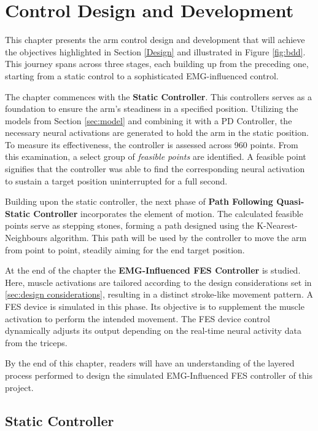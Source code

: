 \chapter{Control Design and Development}

This chapter presents the arm control design and development that will achieve the objectives highlighted in Section \ref{Design} and illustrated in Figure \ref{fig:bdd}. This journey spans across three stages, each building up from the preceding one, starting from a static control to a sophisticated EMG-influenced control.  

The chapter commences with the \textbf{Static Controller}. This controllers serves as a foundation to ensure the arm's steadiness in a specified position. Utilizing the models from Section \ref{sec:model} and combining it with a PD Controller, the necessary neural activations are generated to hold the arm in the static position. To measure its effectiveness, the controller is assessed across 960 points. From this examination, a select group of \textit{feasible points} are identified. A feasible point signifies that the controller was able to find the corresponding neural activation to sustain a target position uninterrupted for a full second. 

Building upon the static controller, the next phase of \textbf{Path Following Quasi-Static Controller} incorporates the element of motion. The calculated feasible points serve as stepping stones, forming a path designed using the K-Nearest-Neighbours algorithm. This path will be used by the controller to move the arm from point to point, steadily aiming for the end target position.

At the end of the chapter the \textbf{EMG-Influenced FES Controller} is studied. Here, muscle activations are tailored according to the design considerations set in \ref{sec:design considerations}, resulting in a distinct stroke-like movement pattern. A FES device is simulated in this phase. Its objective is to supplement the muscle activation to perform the intended movement. The FES device control dynamically adjusts its output depending on the real-time neural activity data from the triceps. 

By the end of this chapter, readers will have an understanding of the layered process performed to design the simulated EMG-Influenced FES controller of this project. 

\section{Static Controller} \label{NeuralController}

